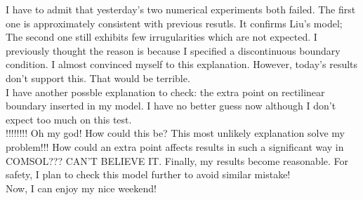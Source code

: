 \documentclass[fontsize=11pt, %
                             paper=a4, %
                             twoside, %
                             captions=tableheading,
                             index=totoc,
                             hyperref]{labbook}
\begin{document}
\begin{addmargin}[4cm]{0cm}
I have to admit that yesterday's two numerical experiments both failed. The first one is approximately consistent with previous resutls. It confirms Liu's model; The second one still exhibits few irrugularities which are not expected. I previously thought the reason is because I specified a discontinuous boundary condition. I almost convinced myself to this explanation. However, today's results don't support this. That would be terrible.\\
I have another possble explanation to check: the extra point on rectilinear boundary inserted in my model. I have no better guess now although I don't expect too much on this test.\\
!!!!!!!! Oh my god! How could this be? This most unlikely explanation solve my problem!!! How could an extra point affects results in such a significant way in COMSOL??? CAN'T BELIEVE IT. Finally, my results become reasonable. For safety, I plan to check this model further to avoid similar mistake! \\
Now, I can enjoy my nice weekend! 
\end{addmargin}





\end{document}
